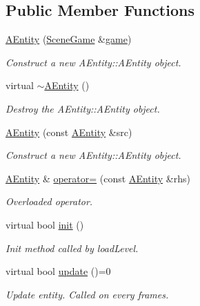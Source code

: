 \subsection*{Public Member Functions}
\begin{DoxyCompactItemize}
\item 
\hyperlink{class_a_entity_ac2e458e7b02ccd083b2e57c0bb27ea24}{A\+Entity} (\hyperlink{class_scene_game}{Scene\+Game} \&\hyperlink{class_a_entity_aa2c05db944a8b7487eb8470dd20211ab}{game})
\begin{DoxyCompactList}\small\item\em Construct a new A\+Entity\+::\+A\+Entity object. \end{DoxyCompactList}\item 
\mbox{\label{class_a_entity_a1680c558ae2cb0d2d65f19147ac857c8}} 
virtual \hyperlink{class_a_entity_a1680c558ae2cb0d2d65f19147ac857c8}{$\sim$\+A\+Entity} ()
\begin{DoxyCompactList}\small\item\em Destroy the A\+Entity\+::\+A\+Entity object. \end{DoxyCompactList}\item 
\hyperlink{class_a_entity_ad1f884ccc47d377efe359e4fc2ce0592}{A\+Entity} (const \hyperlink{class_a_entity}{A\+Entity} \&src)
\begin{DoxyCompactList}\small\item\em Construct a new A\+Entity\+::\+A\+Entity object. \end{DoxyCompactList}\item 
\hyperlink{class_a_entity}{A\+Entity} \& \hyperlink{class_a_entity_a6eddf1d64b54976fbb9286b477fe19d7}{operator=} (const \hyperlink{class_a_entity}{A\+Entity} \&rhs)
\begin{DoxyCompactList}\small\item\em Overloaded operator. \end{DoxyCompactList}\item 
virtual bool \hyperlink{class_a_entity_a450361b684fa02e4ffe0ba406b8e3b30}{init} ()
\begin{DoxyCompactList}\small\item\em Init method called by load\+Level. \end{DoxyCompactList}\item 
virtual bool \hyperlink{class_a_entity_adcfd3958ca43b8efd7cc58e7106a26a8}{update} ()=0
\begin{DoxyCompactList}\small\item\em Update entity. Called on every frames. \end{DoxyCompactList}\item 

\end{DoxyCompactItemize}
